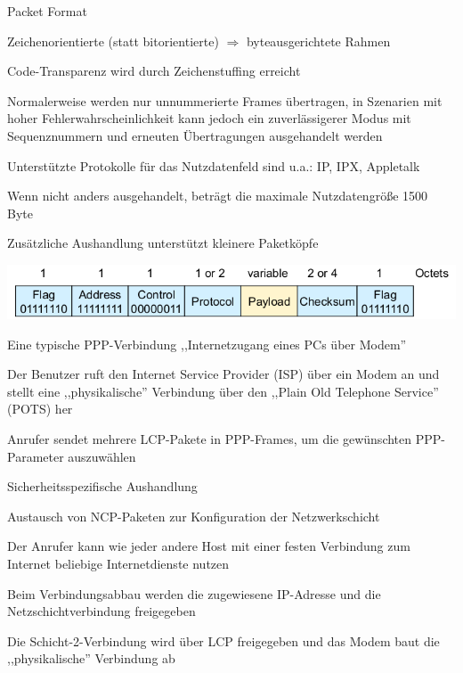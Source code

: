 \documentclass[a4paper]{article}
\begin{document}
\begin{multicols}{3}
      Packet Format
      \begin{itemize*}
            \item Zeichenorientierte (statt bitorientierte) $\Rightarrow$ byteausgerichtete Rahmen
            \item Code-Transparenz wird durch Zeichenstuffing erreicht
            \item Normalerweise werden nur unnummerierte Frames übertragen, in Szenarien mit hoher Fehlerwahrscheinlichkeit kann jedoch ein zuverlässigerer Modus mit Sequenznummern und erneuten Übertragungen ausgehandelt werden
            \item Unterstützte Protokolle für das Nutzdatenfeld sind u.a.: IP, IPX, Appletalk
            \item Wenn nicht anders ausgehandelt, beträgt die maximale Nutzdatengröße 1500 Byte
            \item Zusätzliche Aushandlung unterstützt kleinere Paketköpfe
            \item \includegraphics[width=.8\linewidth]{Assets/NetworkSecurity-Point-to-Point-format.png}
      \end{itemize*}

      Eine typische PPP-Verbindung ,,Internetzugang eines PCs über Modem''
      \begin{itemize*}
            \item Der Benutzer ruft den Internet Service Provider (ISP) über ein Modem an und stellt eine ,,physikalische'' Verbindung über den ,,Plain Old Telephone Service'' (POTS) her
            \item Anrufer sendet mehrere LCP-Pakete in PPP-Frames, um die gewünschten PPP-Parameter auszuwählen
            \item Sicherheitsspezifische Aushandlung
            \item Austausch von NCP-Paketen zur Konfiguration der Netzwerkschicht%
            \item Der Anrufer kann wie jeder andere Host mit einer festen Verbindung zum Internet beliebige Internetdienste nutzen
            \item Beim Verbindungsabbau werden die zugewiesene IP-Adresse und die Netzschichtverbindung freigegeben
            \item Die Schicht-2-Verbindung wird über LCP freigegeben und das Modem baut die ,,physikalische'' Verbindung ab
      \end{itemize*}


\end{multicols}
\end{document}
